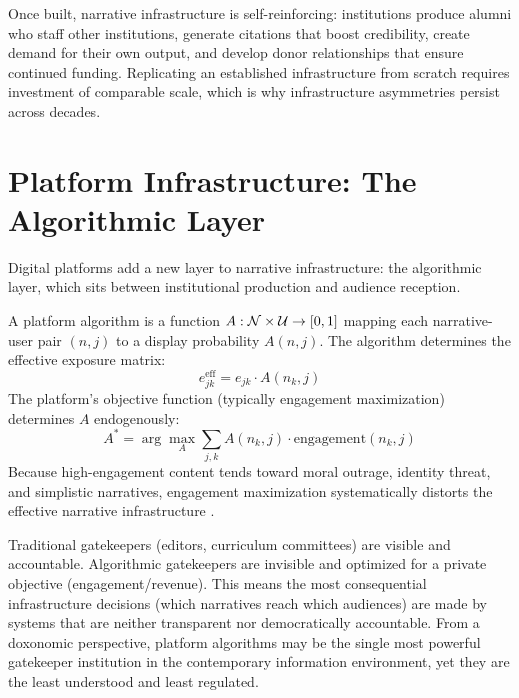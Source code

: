 \begin{principle}
\label{prin:path-dependence}
Once built, narrative infrastructure is self-reinforcing: institutions produce alumni who staff other institutions, generate citations that boost credibility, create demand for their own output, and develop donor relationships that ensure continued funding.
Replicating an established infrastructure from scratch requires investment of comparable scale, which is why infrastructure asymmetries persist across decades.
\end{principle}


\section{Platform Infrastructure: The Algorithmic Layer}
\label{sec:ch7-platforms}

Digital platforms add a new layer to narrative infrastructure: the algorithmic layer, which sits between institutional production and audience reception.

\begin{model}
\label{mod:algorithmic-infra}
A platform algorithm is a function $A: \mathcal{N} \times \mathcal{U} \to [0,1]$ mapping each narrative-user pair $(n, j)$ to a display probability $A(n, j)$.
The algorithm determines the effective exposure matrix:
\[
  e_{jk}^{\text{eff}} = e_{jk} \cdot A(n_k, j)
\]
The platform's objective function (typically engagement maximization) determines $A$ endogenously:
\[
  A^* = \arg\max_A \sum_{j,k} A(n_k, j) \cdot \text{engagement}(n_k, j)
\]
Because high-engagement content tends toward moral outrage, identity threat, and simplistic narratives, engagement maximization systematically distorts the effective narrative infrastructure \autocite{zuboff2019}.
\end{model}

\begin{remark}
\label{rem:invisible-gatekeepers}
Traditional gatekeepers (editors, curriculum committees) are visible and accountable.
Algorithmic gatekeepers are invisible and optimized for a private objective (engagement/revenue).
This means the most consequential infrastructure decisions (which narratives reach which audiences) are made by systems that are neither transparent nor democratically accountable.
From a doxonomic perspective, platform algorithms may be the single most powerful gatekeeper institution in the contemporary information environment, yet they are the least understood and least regulated.
\end{remark}


